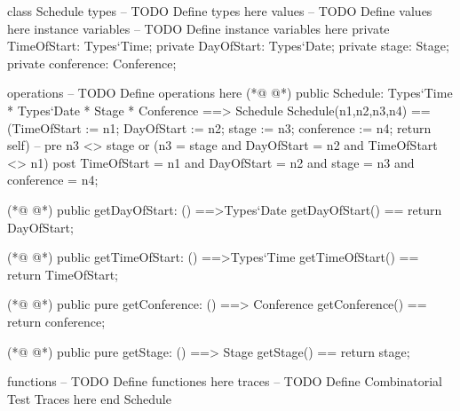 \begin{vdmpp}[breaklines=true]
class Schedule
types
-- TODO Define types here
values
-- TODO Define values here
instance variables
-- TODO Define instance variables here
  private TimeOfStart: Types`Time;
  private DayOfStart: Types`Date;
  private stage: Stage;
  private conference: Conference;
  
operations
-- TODO Define operations here
(*@
\label{Schedule:15}
@*)
  public Schedule: Types`Time * Types`Date * Stage * Conference ==> Schedule
  Schedule(n1,n2,n3,n4) == (TimeOfStart := n1; DayOfStart := n2; stage := n3; conference := n4; return self)
 -- pre n3 <> stage or (n3 = stage and DayOfStart = n2 and TimeOfStart <> n1)
  post TimeOfStart = n1 and DayOfStart = n2 and stage = n3 and conference = n4; 
  
(*@
\label{getDayOfStart:20}
@*)
  public getDayOfStart: () ==>Types`Date
  getDayOfStart() == return DayOfStart;
  
(*@
\label{getTimeOfStart:23}
@*)
  public getTimeOfStart: () ==>Types`Time
  getTimeOfStart() == return TimeOfStart;
  
(*@
\label{getConference:26}
@*)
  public pure getConference: () ==> Conference
  getConference() == return conference;
  
(*@
\label{getStage:29}
@*)
  public pure getStage: () ==> Stage
  getStage() == return stage;
  
  
  
functions
-- TODO Define functiones here
traces
-- TODO Define Combinatorial Test Traces here
end Schedule
\end{vdmpp}
